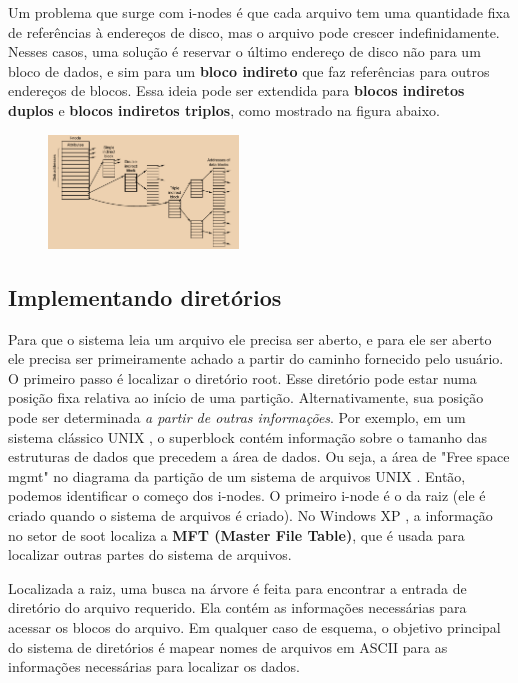 \documentclass{article}
\newcommand\unix{{\color{red}UNIX} }
\newcommand\winxp{{\color{blue}Windows XP} }
\begin{document}
Um problema que surge com i-nodes é que cada arquivo tem uma quantidade fixa de referências à endereços de disco, mas o arquivo pode crescer indefinidamente. Nesses casos, uma solução é reservar o último endereço de disco não para um bloco de dados, e sim para um \textbf{bloco indireto} que faz referências para outros endereços de blocos. Essa ideia pode ser extendida para \textbf{blocos indiretos duplos} e \textbf{blocos indiretos triplos}, como mostrado na figura abaixo.

\begin{figure}[h]
  \begin{center}
    \includegraphics[width=0.45\textwidth]{img/5-11.png}
  \end{center}
  \caption{}
  \label{fig:}
\end{figure}

\subsection{Implementando diretórios}

Para que o sistema leia um arquivo ele precisa ser aberto, e para ele ser aberto ele precisa ser primeiramente achado a partir do caminho fornecido pelo usuário. O primeiro passo é localizar o diretório root. Esse diretório pode estar numa posição fixa relativa ao início de uma partição. Alternativamente, sua posição pode ser determinada \textit{a partir de outras informações}. Por exemplo, em um sistema clássico \unix, o superblock contém informação sobre o tamanho das estruturas de dados que precedem a área de dados. Ou seja, a área de "Free space mgmt" no diagrama da partição de um sistema de arquivos \unix. Então, podemos identificar o começo dos i-nodes. O primeiro i-node é o da raiz (ele é criado quando o sistema de arquivos é criado). No \winxp, a informação no setor de soot localiza a \textbf{MFT (Master File Table)}, que é usada para localizar outras partes do sistema de arquivos.

Localizada a raiz, uma busca na árvore é feita para encontrar a entrada de diretório do arquivo requerido. Ela contém as informações necessárias para acessar os blocos do arquivo. Em qualquer caso de esquema, o objetivo principal do sistema de diretórios é mapear nomes de arquivos em ASCII para as informações necessárias para localizar os dados.
\end{document}
